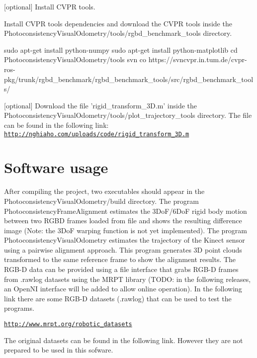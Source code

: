 \begin{DoxyItemize}
\item \mbox{[}optional\mbox{]} Install CVPR tools.
\begin{DoxyEnumerate}
\item Install CVPR tools dependencies and download the CVPR tools inside the PhotoconsistencyVisualOdometry/tools/rgbd\_\-benchmark\_\-tools directory. \begin{DoxyVerb}
sudo apt-get install python-numpy
sudo apt-get install python-matplotlib 
cd PhotoconsistencyVisualOdometry/tools
svn co https://svncvpr.in.tum.de/cvpr-ros-pkg/trunk/rgbd_benchmark/rgbd_benchmark_tools/src/rgbd_benchmark_tools/
\end{DoxyVerb}

\end{DoxyEnumerate}
\item \mbox{[}optional\mbox{]} Download the file 'rigid\_\-transform\_\-3D.m' inside the PhotoconsistencyVisualOdometry/tools/plot\_\-trajectory\_\-tools directory. The file can be found in the following link: \href{http://nghiaho.com/uploads/code/rigid_transform_3D.m}{\tt http://nghiaho.com/uploads/code/rigid\_\-transform\_\-3D.m}
\end{DoxyItemize}\hypertarget{index_usage_sec}{}\section{Software usage}\label{index_usage_sec}
After compiling the project, two executables should appear in the PhotoconsistencyVisualOdometry/build directory. The program PhotoconsistencyFrameAlignment estimates the 3DoF/6DoF rigid body motion between two RGBD frames loaded from file and shows the resulting difference image (Note: the 3DoF warping function is not yet implemented). The program PhotoconsistencyVisualOdometry estimates the trajectory of the Kinect sensor using a pairwise alignment approach. This program generates 3D point clouds transformed to the same reference frame to show the alignment results. The RGB-\/D data can be provided using a file interface that grabs RGB-\/D frames from .rawlog datasets using the MRPT library (TODO: in the following releases, an OpenNI interface will be added to allow online operation). In the following link there are some RGB-\/D datasets (.rawlog) that can be used to test the programs.

\href{http://www.mrpt.org/robotic_datasets}{\tt http://www.mrpt.org/robotic\_\-datasets}

The original datasets can be found in the following link. However they are not prepared to be used in this sofware.

